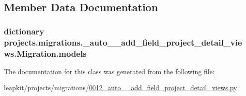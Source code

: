 \subsection{Member Data Documentation}
\hypertarget{classprojects_1_1migrations_1_10012__auto____add__field__project__detail__views_1_1_migration_aa26c5209e1f46bab912e3af64b98d307}{
\subsubsection[{models}]{\setlength{\rightskip}{0pt plus 5cm}dictionary projects.\-migrations.\-\_\-auto\-\_\-\-\_\-add\-\_\-field\-\_\-project\-\_\-detail\-\_\-views.\-Migration.\-models\hspace{0.3cm}{\ttfamily [static]}}}\label{classprojects_1_1migrations_1_10012__auto____add__field__project__detail__views_1_1_migration_aa26c5209e1f46bab912e3af64b98d307}


The documentation for this class was generated from the following file\-:\begin{DoxyCompactItemize}
\item 
leapkit/projects/migrations/\hyperlink{0012__auto____add__field__project__detail__views_8py}{0012\-\_\-auto\-\_\-\-\_\-add\-\_\-field\-\_\-project\-\_\-detail\-\_\-views.\-py}\end{DoxyCompactItemize}
